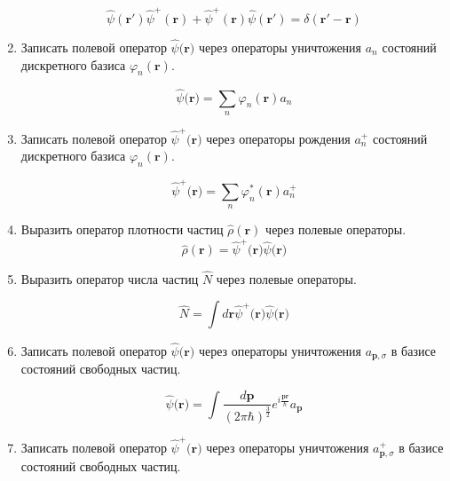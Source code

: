 \documentclass{article}
\begin{document}
\begin{enumerate}
	\begin{equation}
		\hat{\psi}(\textbf{r}')\hat{\psi}^+(\textbf{r}) + \hat{\psi}^+(\textbf{r})\hat{\psi}(\textbf{r}') = \delta(\textbf{r}' - \textbf{r})
	\end{equation}
	
	\item {Записать полевой оператор $\hat{\psi}(\textbf{r)}$ через операторы уничтожения $a_n$ состояний дискретного базиса $\varphi_n(\textbf{r})$.}

	\begin{equation}
		\hat{\psi}(\textbf{r)} = \sum\limits_{n} \varphi_n(\textbf{r}) a_n
	\end{equation}		
	
	\item {Записать полевой оператор $\hat{\psi}^+(\textbf{r)}$ через операторы рождения $a_n^+$ состояний дискретного базиса $\varphi_n(\textbf{r})$.}		
	
	\begin{equation}
		\hat{\psi}^+(\textbf{r)} = \sum\limits_{n} \varphi_n^*(\textbf{r}) a_n^+
	\end{equation}	
	
	\item {Выразить оператор плотности частиц $\hat{\rho}(\textbf{r})$ через полевые операторы.}	
	\begin{equation}
		\hat{\rho}(\textbf{r}) = \hat{\psi}^+(\textbf{r)} \hat{\psi}(\textbf{r)}
	\end{equation}
	
	\item {Выразить оператор числа частиц $\hat{N}$ через полевые операторы.}
	
	\begin{equation}
		\hat{N} = \int d\textbf{r}\hat{\psi}^+(\textbf{r)} \hat{\psi}(\textbf{r)}
	\end{equation}
	
	\item {Записать полевой оператор $\hat{\psi}(\textbf{r)}$ через операторы уничтожения $a_{\textbf{p},\sigma}$ в базисе состояний свободных частиц.}
	
	\begin{equation}
		\hat{\psi}(\textbf{r)} = \int \frac{d\textbf{p}}{(2\pi\hbar)^\frac{3}{2}} e^{i\frac{\textbf{pr}}{\hbar}}a_\textbf{p}
	\end{equation}
	
	\item {Записать полевой оператор $\hat{\psi}^+(\textbf{r)}$ через операторы уничтожения $a^+_{\textbf{p},\sigma}$ в базисе состояний свободных частиц.}
	

\end{enumerate}
\end{document}
